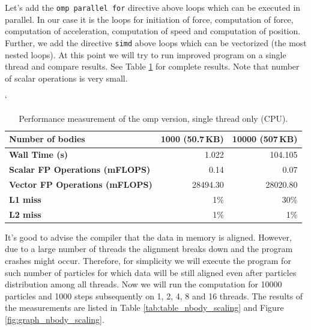 \par Let's add the \texttt{omp parallel for} directive above loops which can be executed in parallel. In our case it is the loops for initiation of force, computation of force, computation of acceleration, computation of speed and computation of position. Further, we add the directive \texttt{simd} above loops which can be vectorized (the most nested loops). At this point we will try to run improved program on a single thread and compare results. See Table \ref{tab:table_nbody_omp_1thread} for complete results. Note that number of scalar operations is very small.

\begin{table}[ht]
\catcode`
\begin{center}
\begin{tabular}{| l | r | r |} \hline
\textbf{Number of bodies} & 1000 (50.7\,KB) & 10000 (507\,KB)\\ \hline
\textbf{Wall Time (s)} & 1.022 & 104.105\\ \hline
\textbf{Scalar FP Operations (mFLOPS)} & 0.14 & 0.07\\ \hline
\textbf{Vector FP Operations (mFLOPS)} & 28494.30 & 28020.80\\ \hline
\textbf{L1 miss} & 1\% & 30\%\\ \hline
\textbf{L2 miss} & 1\% & 1\%\\ \hline
\end{tabular}
\caption{Performance measurement of the omp version, single thread only (CPU).}
\label{tab:table_nbody_omp_1thread}
\end{center}
\end{table}

\par It's good to advise the compiler that the data in memory is aligned. However, due to a large number of threads the alignment breaks down and the program crashes might occur. Therefore, for simplicity we will execute the program for such number of particles for which data will be still aligned even after particles distribution among all threads. Now we will run the computation for 10000 particles and 1000 steps subsequently on 1, 2, 4, 8 and 16 threads. The results of the measurements are listed in Table \ref{tab:table_nbody_scaling} and Figure \ref{fig:graph_nbody_scaling}. 


